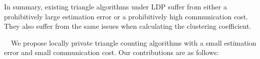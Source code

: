 In summary, existing triangle algorithms under LDP suffer from either a prohibitively large estimation error or a prohibitively 
high 
communication cost.
They also suffer from the same issues when calculating the clustering coefficient.


\smallskip
{}~~We 
propose locally private triangle counting algorithms with a small estimation error and small communication cost.
Our contributions are as follows:

